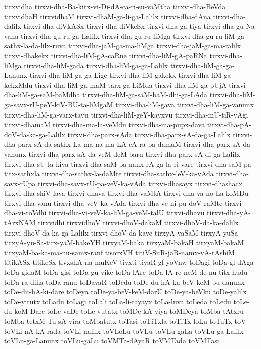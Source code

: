 {tirxvidha
tirxvi-dha-Ba-kitx-vi-Di-dA-ca-ri-su-vaMtha
tirxvi-dha-BeVda
tirxvidhaH
tirxvidhaM
tirxvi-dhaM-ga-li-ga-Lalilx
tirxvi-dha-dAna
tirxvi-dha-dalilx
tirxvi-dha-diVkASx
tirxvi-dha-diVkeSx
tirxvi-dha-ga-tiya
tirxvi-dha-gu-Na-vana
tirxvi-dha-gu-ru-ga-Lalilx
tirxvi-dha-gu-ru-liMga
tirxvi-dha-gu-ru-liM-ga-sathx-la-da-lilx-ruva
tirxvi-dha-jaM-ga-ma-liMga
tirxvi-dha-jaM-ga-ma-ralilx
tirxvi-dhakekx
tirxvi-dha-liM-gA-caRne
tirxvi-dha-liM-gA-paRNa
tirxvi-dha-liMga
tirxvi-dha-liM-gada
tirxvi-dha-liM-ga-ga-Lalilx
tirxvi-dha-liM-ga-ga-Lanunx
tirxvi-dha-liM-ga-ga-Lige
tirxvi-dha-liM-gakekx
tirxvi-dha-liM-ga-kekxMdu
tirxvi-dha-liM-ga-maM-tarx-ga-LiMda
tirxvi-dha-liM-ga-pUjA
tirxvi-dha-liM-ga-saM-baMdha
tirxvi-dha-liM-ga-saM-baM-dhi-ga-LAda
tirxvi-dha-liM-ga-savx-rU-peY-kiV-BU-ta-liMgaM
tirxvi-dha-liM-gava
tirxvi-dha-liM-ga-vanunx
tirxvi-dha-liM-ga-varx-tavu
tirxvi-dha-liM-geY-kayxvu
tirxvi-dha-mU-tiR-yAgi
tirxvi-dhamaM
tirxvi-dha-ma-la-veMdu
tirxvi-dha-ma-pupx-dava
tirxvi-dha-pA-doV-da-ka-ga-Lalilx
tirxvi-dha-parx-sAda
tirxvi-dha-parx-sA-da-ga-Lalilx
tirxvi-dha-parx-sA-da-sathx-La-ma-na-ma-LA-cA-ra-pa-damaM
tirxvi-dha-parx-sA-da-vanunx
tirxvi-dha-parx-sA-da-veM-deM-baru
tirxvi-dha-parx-sA-di-ga-Lalilx
tirxvi-dha-sU-ta-kiya
tirxvi-dha-saM-pa-nanx-rA-ga-la-ri-vare
tirxvi-dha-saM-pa-titx-sathxla
tirxvi-dha-sathx-la-daMte
tirxvi-dha-sathx-leV-ka-vAda
tirxvi-dha-savx-rUpa
tirxvi-dha-savx-rU-pa-veV-ka-vAda
tirxvi-dhasayx
tirxvi-dhashacx
tirxvi-dha-shiV-lava
tirxvi-dhava
tirxvi-dha-vaMtA
tirxvi-dha-va-no-La-koMDu
tirxvi-dha-vanu
tirxvi-dha-veV-ka-vAda
tirxvi-dha-ve-ni-pu-doV-raMte
tirxvi-dha-vi-roVdhi
tirxvi-dha-vi-veV-ka-liM-ga-veM-talU
tirxvi-dhavu
tirxvi-dha-yA-tArxNAM
tirxvidhi
tirxvidhoV
tirxvi-dhoV-dakaM
tirxvi-dhoV-da-ka-dalilx
tirxvi-dhoV-da-ka-ga-Lalilx
tirxvi-dhoV-da-kave
tirxyA-yaSaM
tirxyA-yuSa
tirxyA-yu-Sa-tirx-yaM-bakeYH
tirxyaM-baka
tirxyaM-bakaH
tirxyaM-bakaM
tirxyaM-ba-ka-ma-nu-samx-ranf
tisorxVH
titiV-SuR-jaR-namx-vA-rAshiM
titikASx
titikeSx
tivxshA-na-muKeV
tivxti
tiyaR-gf-yoVnw
toDagi
toDa-gi-dAga
toDa-gidaM
toDa-gisi
toDa-gu-vike
toDa-lAre
toDa-lA-re-neM-de-nu-titx-hudu
toDa-ra-diha
toDa-ranu
toDavaR
toDedu
toDe-du-hA-ka-beV-keM-bu-danunx
toDe-du-hA-ki-dare
toDeya
toDe-ya-beV-keM-darU
toDe-ya-beVku
toDe-yalilx
toDe-yitutx
toLadu
toLagi
toLali
toLa-li-tayayx
toLa-luva
toLeda
toLedu
toLe-du-koM-Dare
toLe-vaDe
toLe-vutatx
toMDe-kA-yiya
toMDeya
toMba-tAtxru
toMba-tetxM-Tu-sA-vira
toMbatutx
toTasi
toTiTxla
toTiTx-loLu
toTuTx
toV
toVLi-nA-kA-rada
toVLi-nalilx
toVLoLu
toVLu
toVLu-gaLa
toVLu-ga-Lalilx
toVLu-ga-Lanunx
toVLu-gaLu
toVMTa-dAyaR
toVMTada
toVMTasi
}
